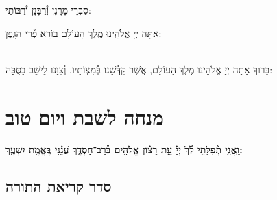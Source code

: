 \documentclass[twoside, openany, parskip=half, 11pt]{book}
\begin{document}
\vspace{-.5\baselineskip}

\begin{scriptsize}
סַבְרֵי מָרָנָן וְ֯רַבָּנָן וְ֯רַבּוֹתַי: \\
\end{scriptsize}
אַתָּה יְיָ אֱלֹהֵֽינוּ מֶֽלֶךְ הָעוֹלָם בּוֹרֵא פְּ֯רִי הַגָֽפֶן:

\begin{sometimes}

\\
בָּרוּךְ אַתָּה יְיָ אֱלֹהֵינוּ מֶלֶךְ הָעוֹלָם, אֲשֶׁר קִדְּ֯שָׁנוּ בְּ֯מִצְוֹתָיו, וְ֯צִוָּנוּ לֵישֵׁב בַּסֻּכָּה:\\
\end{sometimes}

%
\chapter[מנחה לשבת ויו״ט]{ מנחה לשבת ויום טוב }

\ashrei

\uvaletzion

\halfkaddish


\textbf{וַֽאֲנִ֤י תְ֯פִלָּתִ֥י לְ֯ךָ֙ יְיָ֡ עֵ֤ת רָצ֗וֹן אֱלֹהִ֥ים בְּ֯רָב־חַסְדֶּ֑ךָ עֲ֝נֵ֗נִי בֶּֽאֱמֶ֥ת יִשְׁעֶֽךָ:} 


\section*{ סדר קריאת התורה }


\pesicha

\brikhshmei

\gadlu

\avharachamim

\vesigale


\torahbarachu

\hagomel

\nextpage
\hagbaha

\yehalelu

\\
\kafdalet

\nextpage
\etzchaim

\end{document}
